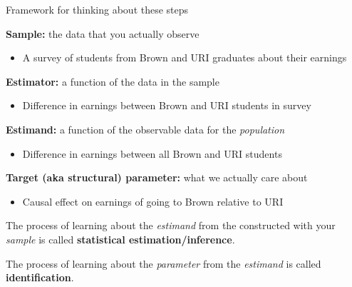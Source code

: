 \documentclass[11pt,english,handout]{beamer}
\newenvironment{wideitemize}{\itemize\addtolength{\itemsep}{10pt}}{\enditemize}
\begin{document}
\begin{frame}{Framework for thinking about these steps}
	
\begin{wideitemize}

\item \textbf{Sample:} the data that you actually observe
	\begin{itemize}
		\item
		A survey of students from Brown and URI graduates about their earnings 
	\end{itemize}

\pause
\item \textbf{Estimator:} a function of the data in the sample 
	\begin{itemize}
		\item Difference in earnings between Brown and URI students in survey
	\end{itemize}

\pause
\item \textbf{Estimand:} a function of the observable data for the \textit{population}
	\begin{itemize}
		\item Difference in earnings between all Brown and URI students 
	\end{itemize}

\pause 
\item \textbf{Target (aka structural) parameter:} what we actually care about
	\begin{itemize}
		\item Causal effect on earnings of going to Brown relative to URI
	\end{itemize}

\end{wideitemize}	

\medskip
\pause
\begin{wideitemize}

\item The process of learning about the \textit{estimand} from the  constructed with your \textit{sample} is called \textbf{statistical estimation/inference}.

\pause 
\item The process of learning about the \textit{parameter} from the \textit{estimand} is called \textbf{identification}.

\end{wideitemize}
	
\end{frame}
\end{document}

